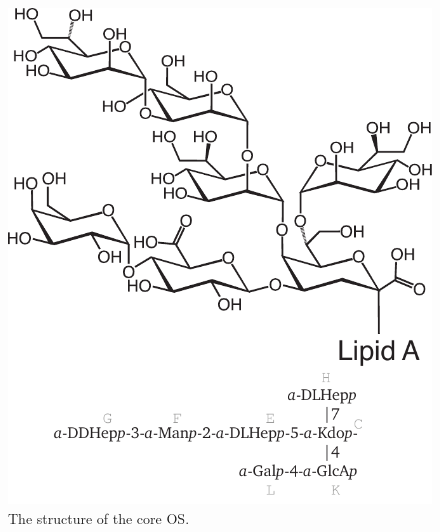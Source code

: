         \begin{figure}[htb]
          \begin{center}
            \includegraphics[]{lps_chapter/img/lpscore.pdf}
          \end{center}
          \caption{The structure of the \caulobacter core \ac{OS}.}
          \label{fig:lpscore}
        \end{figure}

